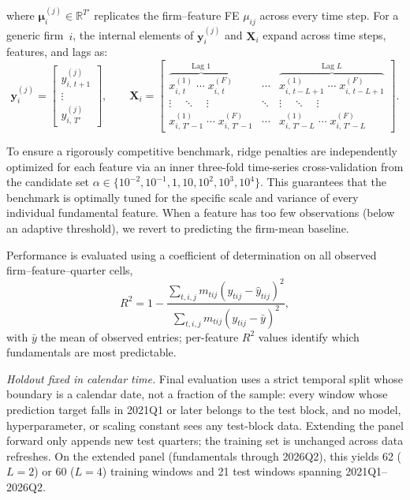 \documentclass[pdflatex,sn-mathphys-num]{sn-jnl}%
\theoremstyle{thmstyleone}%
\theoremstyle{thmstyletwo}%
\theoremstyle{thmstylethree}%
\begin{document}
where $\boldsymbol{\mu}_i^{(j)} \in \mathbb{R}^{T'}$ replicates the firm--feature FE $\mu_{ij}$ across every time step. For a generic firm~$i$, the internal elements of $\mathbf{y}_i^{(j)}$ and $\mathbf{X}_i$ expand across time steps, features, and lags as:
\begin{equation} \label{eq:ridge_firm_elements}
\mathbf{y}_i^{(j)} =
\begin{bmatrix}
y_{i,\, t+1}^{(j)} \\
\vdots \\
y_{i,\, T'}^{(j)}
\end{bmatrix},
\qquad
\mathbf{X}_i =
\begin{bmatrix}
\overbrace{x_{i,\, t}^{(1)} \;\cdots\; x_{i,\, t}^{(F)}}^{\text{Lag } 1} & \cdots &
\overbrace{x_{i,\, t-L+1}^{(1)} \;\cdots\; x_{i,\, t-L+1}^{(F)}}^{\text{Lag } L} \\[4pt]
\vdots \quad \ddots \quad \vdots & \ddots & \vdots \quad \ddots \quad \vdots \\[4pt]
x_{i,\, T'\!-1}^{(1)} \;\cdots\; x_{i,\, T'\!-1}^{(F)} & \cdots &
x_{i,\, T'\!-L}^{(1)} \;\cdots\; x_{i,\, T'\!-L}^{(F)}
\end{bmatrix}.
\end{equation}

To ensure a rigorously competitive benchmark, ridge penalties are independently optimized for each feature via an inner three-fold time-series cross-validation from the candidate set $\alpha \in \{10^{-2}, 10^{-1}, 1, 10, 10^2, 10^3, 10^4\}$. This guarantees that the benchmark is optimally tuned for the specific scale and variance of every individual fundamental feature. When a feature has too few observations (below an adaptive threshold), we revert to predicting the firm-mean baseline.

Performance is evaluated using a coefficient of determination on all observed firm--feature--quarter cells,
\begin{equation}
R^2 = 1 - \frac{\sum_{t,i,j} m_{tij} (y_{tij} - \widehat{y}_{tij})^2}
{\sum_{t,i,j} m_{tij} (y_{tij} - \bar{y})^2},
\end{equation}
with $\bar{y}$ the mean of observed entries; per-feature $R^2$ values identify which fundamentals are most predictable.

\textit{Holdout fixed in calendar time.} Final evaluation uses a strict temporal split whose boundary is a calendar date, not a fraction of the sample: every window whose prediction target falls in 2021Q1 or later belongs to the test block, and no model, hyperparameter, or scaling constant sees any test-block data. Extending the panel forward only appends new test quarters; the training set is unchanged across data refreshes. On the extended panel (fundamentals through 2026Q2), this yields 62 ($L=2$) or 60 ($L=4$) training windows and 21 test windows spanning 2021Q1--2026Q2.
\end{document}
